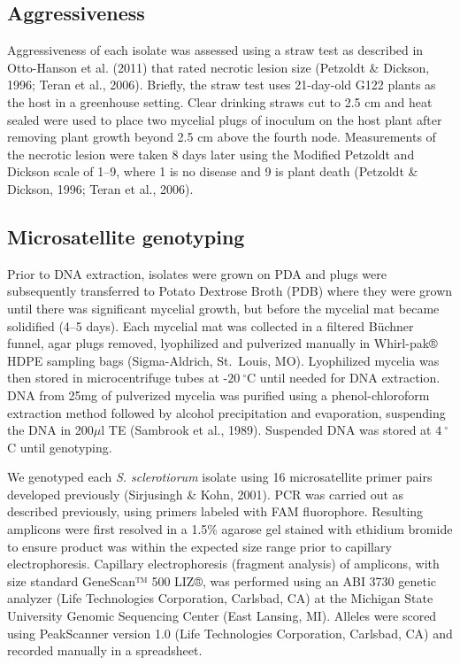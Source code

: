 \subsection*{Aggressiveness}\label{aggressiveness}

Aggressiveness of each isolate was assessed using a straw test as
described in Otto-Hanson et al. (2011) that rated necrotic lesion size
(Petzoldt \& Dickson, 1996; Teran et al., 2006). Briefly, the straw test
uses 21-day-old G122 plants as the host in a greenhouse setting. Clear
drinking straws cut to 2.5 cm and heat sealed were used to place two
mycelial plugs of inoculum on the host plant after removing plant growth
beyond 2.5 cm above the fourth node. Measurements of the necrotic lesion
were taken 8 days later using the Modified Petzoldt and Dickson scale of
1--9, where 1 is no disease and 9 is plant death (Petzoldt \& Dickson,
1996; Teran et al., 2006).

\subsection*{Microsatellite genotyping}\label{microsatellite-genotyping}

Prior to DNA extraction, isolates were grown on PDA and plugs were
subsequently transferred to Potato Dextrose Broth (PDB) where they were
grown until there was significant mycelial growth, but before the
mycelial mat became solidified (4--5 days). Each mycelial mat was
collected in a filtered Büchner funnel, agar plugs removed, lyophilized
and pulverized manually in Whirl-pak® HDPE sampling bags (Sigma-Aldrich,
St.~Louis, MO). Lyophilized mycelia was then stored in microcentrifuge
tubes at -\(20~^{\circ}\)C until needed for DNA extraction. DNA from
25mg of pulverized mycelia was purified using a phenol-chloroform
extraction method followed by alcohol precipitation and evaporation,
suspending the DNA in 200\(\mu\)l TE (Sambrook et al., 1989). Suspended
DNA was stored at \(4~^{\circ}\)C until genotyping.

We genotyped each \emph{S. sclerotiorum} isolate using 16 microsatellite
primer pairs developed previously (Sirjusingh \& Kohn, 2001). PCR was
carried out as described previously, using primers labeled with FAM
fluorophore. Resulting amplicons were first resolved in a 1.5\% agarose
gel stained with ethidium bromide to ensure product was within the
expected size range prior to capillary electrophoresis. Capillary
electrophoresis (fragment analysis) of amplicons, with size standard
GeneScan™ 500 LIZ®, was performed using an ABI 3730 genetic analyzer
(Life Technologies Corporation, Carlsbad, CA) at the Michigan State
University Genomic Sequencing Center (East Lansing, MI). Alleles were
scored using PeakScanner version 1.0 (Life Technologies Corporation,
Carlsbad, CA) and recorded manually in a spreadsheet.

